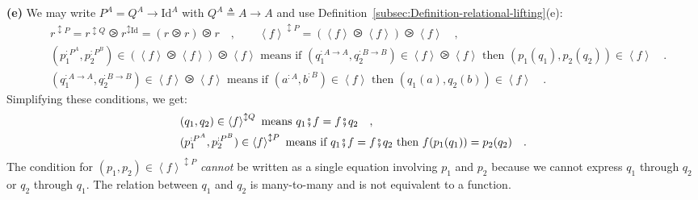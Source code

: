 \textbf{(e)} We may write $P^{A}=Q^{A}\rightarrow\text{Id}^{A}$ with
$Q^{A}\triangleq A\rightarrow A$ and use Definition~\ref{subsec:Definition-relational-lifting}(e):
\begin{align*}
 & r^{\updownarrow P}=r^{\updownarrow Q}\ogreaterthan r^{\updownarrow\text{Id}}=(r\ogreaterthan r)\ogreaterthan r\quad,\quad\quad\left<f\right>^{\updownarrow P}=(\left<f\right>\ogreaterthan\left<f\right>)\ogreaterthan\left<f\right>\quad,\\
 & (p_{1}^{:P^{A}},p_{2}^{:P^{B}})\in(\left<f\right>\ogreaterthan\left<f\right>)\ogreaterthan\left<f\right>\text{ means if }(q_{1}^{:A\rightarrow A},q_{2}^{:B\rightarrow B})\in\left<f\right>\ogreaterthan\left<f\right>\text{ then }(p_{1}(q_{1}),p_{2}(q_{2}))\in\left<f\right>\quad.\\
 & (q_{1}^{:A\rightarrow A},q_{2}^{:B\rightarrow B})\in\left<f\right>\ogreaterthan\left<f\right>\text{ means if }(a^{:A},b^{:B})\in\left<f\right>\text{ then }(q_{1}(a),q_{2}(b))\in\left<f\right>\quad.
\end{align*}
Simplifying these conditions, we get:
\begin{align}
 & (q_{1},q_{2})\in\left<f\right>^{\updownarrow Q}\text{ means }q_{1}\bef f=f\bef q_{2}\quad,\nonumber \\
 & (p_{1}^{:P^{A}},p_{2}^{:P^{B}})\in\left<f\right>^{\updownarrow P}\text{ means if }q_{1}\bef f=f\bef q_{2}\text{ then }f(p_{1}(q_{1}))=p_{2}(q_{2})\quad.\label{eq:relational-lifting-example-e-derivation1}
\end{align}
The condition for $(p_{1},p_{2})\in\left<f\right>^{\updownarrow P}$
\emph{cannot} be written as a single equation involving $p_{1}$ and
$p_{2}$ because we cannot express $q_{1}$ through $q_{2}$ or $q_{2}$
through $q_{1}$. The relation between $q_{1}$ and $q_{2}$ is many-to-many
and is not equivalent to a function.

